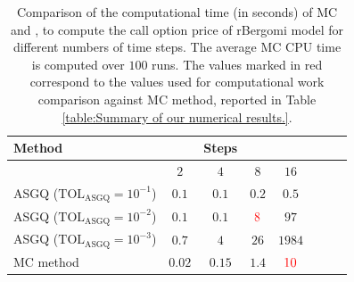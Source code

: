 \FloatBarrier
\begin{table}[h!]
	\centering
	\begin{tabular}{l*{6}{c}r}
	\toprule[1.5pt]
	Method & & Steps  & &     \\
	\hline	
		        & $2$ & $4$ & $8$ & $16$ &   \\
		\hline
		ASGQ ($\text{TOL}_{\text{ASGQ}}=10^{-1}$)  & $0.1$ & $0.1$ & $0.2$ & $0.5$ \\
		ASGQ ($\text{TOL}_{\text{ASGQ}}=10^{-2}$)  & $0.1$ & $0.1$ & $\red{8}$ & $97$ \\
		ASGQ ($\text{TOL}_{\text{ASGQ}}=10^{-3}$)  & $0.7$ & $4$ & $26$ & $1984$ \\
%		
		\hline
		MC method   & $ 0.02
		
		$  & $  0.15$  & $ 1.4$ & $ \red{10}$  \\	
	\bottomrule[1.25pt]
%		
%				
	\end{tabular}
	\caption{Comparison of the computational time (in seconds) of  MC and , to compute the call option price of rBergomi model for different numbers of time steps. The average  MC CPU time is computed over $100$ runs. The values marked in red correspond to the values used for computational work comparison against MC method, reported in Table \ref{table:Summary of our numerical results.}. }
	\label{Comparsion of the computational time of  MC and MISC, used to compute Call option price of rBergomi model for different number of time steps. Case set5}
\end{table}

\FloatBarrier


